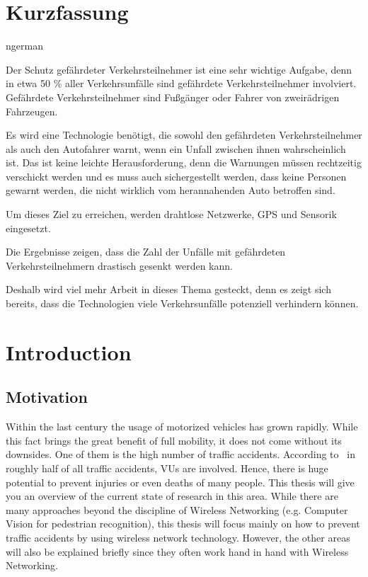 \documentclass[]{ccs-thesis}
\begin{document}
\chapter*{Kurzfassung}
\begin{otherlanguage*}{ngerman}

Der Schutz gefährdeter Verkehrsteilnehmer ist eine sehr wichtige Aufgabe, denn in etwa 50 \% aller Verkehrsunfälle sind gefährdete Verkehrsteilnehmer involviert. Gefährdete Verkehrsteilnehmer sind Fußgänger oder Fahrer von zweirädrigen Fahrzeugen.

Es wird eine Technologie benötigt, die sowohl den gefährdeten Verkehrsteilnehmer als auch den Autofahrer warnt, wenn ein Unfall zwischen ihnen wahrscheinlich ist.  Das ist keine leichte Herausforderung, denn die Warnungen müssen rechtzeitig verschickt werden und es muss auch sichergestellt werden, dass keine Personen gewarnt werden, die nicht wirklich vom herannahenden Auto betroffen sind.

Um dieses Ziel zu erreichen, werden drahtlose Netzwerke, GPS und Sensorik eingesetzt.

Die Ergebnisse zeigen, dass die Zahl der Unfälle mit gefährdeten Verkehrsteilnehmern drastisch gesenkt werden kann.

Deshalb wird viel mehr Arbeit in dieses Thema gesteckt, denn es zeigt sich bereits, dass die Technologien viele Verkehrsunfälle potenziell verhindern können.

\end{otherlanguage*}
\acresetall

\cleardoublepage
\tableofcontents
{}

\cleardoublepage
{}


\chapter{Introduction}
\label{chap:introduction}


\section{Motivation}
\label{sec:motivation}

Within the last century the usage of motorized vehicles has grown rapidly. While this fact brings the great benefit of full mobility, it does not come without its downsides. One of them is the high number of traffic accidents. According to~\cite{v2pcomm} in roughly half of all traffic accidents, \acp{VU} are involved. Hence, there is huge potential to prevent injuries or even deaths of many people. This thesis will give you an overview of the current state of research in this area. While there are many approaches beyond the discipline of Wireless Networking (e.g. Computer Vision for pedestrian recognition), this thesis will focus mainly on how to prevent traffic accidents by using wireless network technology. However, the other areas will also be explained briefly since they often work hand in hand with Wireless Networking.
\end{document}
